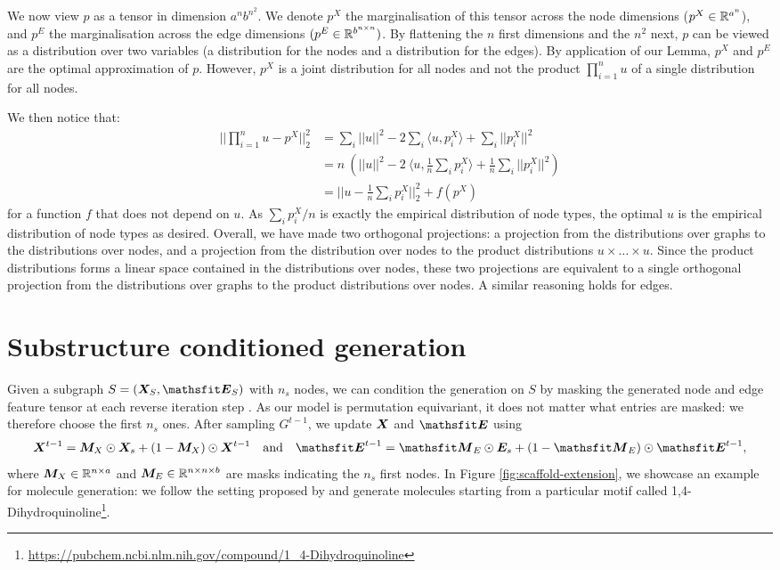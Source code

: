 \documentclass{article} %
\theoremstyle{plain}
\theoremstyle{definition}
\theoremstyle{remark}
\begin{document}
We now view $p$ as a tensor in dimension $a^n b^{n^2}$.  We denote $p^X$ the marginalisation of this tensor across the node dimensions ($p^X \in \mathbb{R}^{a^n}$), and $p^E$ the marginalisation across the edge dimensions $(p^E \in \mathbb{R}^{b^{n \times n}})$.
By flattening the $n$ first dimensions and the $n^2$ next, $p$ can be viewed as a distribution over two variables (a distribution for the nodes and a distribution for the edges). By application of our Lemma, $p^X$ and $p^E$ are the optimal approximation of $p$. However, $p^X$ is a joint distribution for all nodes and not the product $\prod_{i=1}^n u $ of a single distribution for all nodes. 

We then notice that:
\begin{align*}
|| \prod_{i=1}^n u - p^X||_2^2 &= \sum_i ||u||^2 - 2 \sum_i \langle u, p^X_i \rangle + \sum_i ||p^X_i||^2 \\
                             &= n~ ( ||u||^2 - 2 ~\langle u, \frac{1}{n} \sum_i p^X_i \rangle + \frac{1}{n} \sum_i ||p^X_i||^2) \\
                             &= ||u - \frac{1}{n} \sum_{i} p^X_i ||_2^2 + f(p^X)
\end{align*}
for a function $f$ that does not depend on $u$. As $\sum_{i} p_i^X / n$ is exactly the empirical distribution of node types, the optimal $u$ is the empirical distribution of node types as desired. 
Overall, we have made two orthogonal projections: a projection from the distributions over graphs to the distributions over nodes, and a projection from the distribution over nodes to the product distributions $u \times \dots \times u$. Since the product distributions forms a linear space contained in the distributions over nodes, these two projections are equivalent to a single orthogonal projection from the distributions over graphs to the product distributions over nodes.
A similar reasoning holds for edges.



\section{Substructure conditioned generation} \label{appendix:scaffold-extension}

Given a subgraph $S = (\mX_S, \tE_S)$ with $n_s$ nodes, we can condition the generation on $S$ by masking the generated node and edge feature tensor at each reverse iteration step \citep{lugmayr2022repaint}. As our model is permutation equivariant, it does not matter what entries are masked: we therefore choose the first $n_s$ ones. After sampling $G^{t-1}$, we update ${\bm{X}}$ and $\tE$ using
$$
\mX^{t-1} = \mM_X \odot \mX_s + (1 - \mM_X) \odot \mX^{t-1} \quad \text{and} \quad 
\tE^{t-1} = \tM_E \odot \mE_s + (1 - \tM_E) \odot \tE^{t-1},
$$
where ${\bm{M}}_X \in \mathbb{R}^{n \times a}$ and ${\bm{M}}_E \in \mathbb{R}^{n \times n \times b}$ are masks indicating the $n_s$ first nodes. In Figure \ref{fig:scaffold-extension}, we showcase an example for molecule generation: we follow the setting proposed by \citep{maziarz2021learning} and generate molecules starting from a particular motif called 1,4-Dihydroquinoline\footnote{\url{https://pubchem.ncbi.nlm.nih.gov/compound/1_4-Dihydroquinoline}}.
\end{document}
